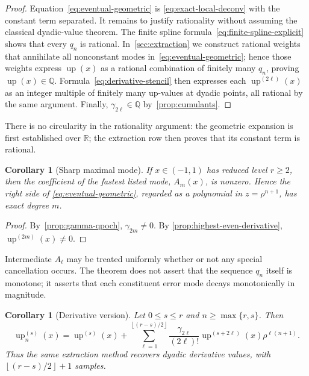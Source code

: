 \documentclass[11pt,a4paper]{article}
\newtheorem{corollary}[theorem]{Corollary}
\theoremstyle{remark}
\newcommand{\R}{\mathbb{R}}
\newcommand{\Q}{\mathbb{Q}}
\newcommand{\up}{\operatorname{up}}
\newcommand{\floor}[1]{\left\lfloor #1\right\rfloor}
\begin{document}
\begin{proof}
Equation~\eqref{eq:eventual-geometric} is
\eqref{eq:exact-local-deconv} with the constant term separated.  It remains
to justify rationality without assuming the classical dyadic-value theorem.
The finite spline formula~\eqref{eq:finite-spline-explicit} shows that every
$q_n$ is rational.  In~\cref{sec:extraction} we construct rational weights
that annihilate all nonconstant modes in~\eqref{eq:eventual-geometric}; hence
those weights express $\up(x)$ as a rational combination of finitely many
$q_n$, proving $\up(x)\in\Q$.  Formula~\eqref{eq:derivative-stencil} then
expresses each $\up^{(2\ell)}(x)$ as an integer multiple of finitely many
up-values at dyadic points, all rational by the same argument.  Finally,
$\gamma_{2\ell}\in\Q$ by~\cref{prop:cumulants}.
\end{proof}

There is no circularity in the rationality argument: the geometric expansion
is first established over $\R$; the extraction row then proves that its
constant term is rational.

\begin{corollary}[Sharp maximal mode]
\label{cor:sharp-mode}
If $x\in(-1,1)$ has reduced level $r\ge2$, then the coefficient of the fastest
listed mode, $A_m(x)$, is nonzero.  Hence the right side of
\eqref{eq:eventual-geometric}, regarded as a polynomial in
$z=\rho^{n+1}$, has exact degree $m$.
\end{corollary}

\begin{proof}
By~\cref{prop:gamma-qpoch}, $\gamma_{2m}\ne0$.  By
\cref{prop:highest-even-derivative}, $\up^{(2m)}(x)\ne0$.
\end{proof}

Intermediate $A_\ell$ may be treated uniformly whether or not any special
cancellation occurs.  The theorem does not assert that the sequence $q_n$
itself is monotone; it asserts that each constituent error mode decays
monotonically in magnitude.

\begin{corollary}[Derivative version]
\label{cor:derivative-version}
Let $0\le s\le r$ and $n\ge\max\{r,s\}$.  Then
\begin{equation}
 \up_n^{(s)}(x)=\up^{(s)}(x)+
 \sum_{\ell=1}^{\floor{(r-s)/2}}
 \frac{\gamma_{2\ell}}{(2\ell)!}\up^{(s+2\ell)}(x)
 \rho^{\ell(n+1)}.
 \label{eq:derivative-eventual}
\end{equation}
Thus the same extraction method recovers dyadic derivative values, with
$\floor{(r-s)/2}+1$ samples.
\end{corollary}
\end{document}
